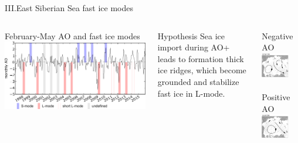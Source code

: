 \documentclass[8pt]{beamer}
\begin{document}
\setwatermark{\fontsize{125pt}{125pt}\selectfont{}}
\begin{frame}[fragile]{III.East Siberian Sea fast ice modes}
\begin{center}
\begin{columns}
	\centering
	February-May AO and fast ice modes
	\includegraphics[width=1\textwidth]{./img/AO.pdf}\\~\\
	\begin{block}{Hypothesis}
		Sea ice import during AO+ leads to formation thick ice ridges, which become grounded and stabilize fast ice in L-mode.
	\end{block}
	Negative AO
	\includegraphics[width=0.7\textwidth]{./img/HighAO_Rigor.png}\\~\\
	Positive AO
	\includegraphics[width=0.7\textwidth]{./img/LowAO_Rigor.png}
\end{columns}	


\end{center}
\end{frame}
\end{document}
